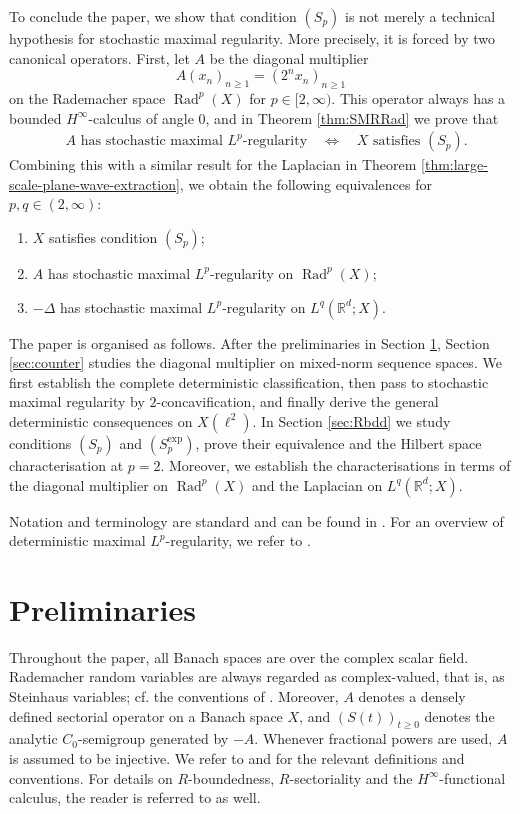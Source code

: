 \documentclass{amsart}
\let\geq\geqslant
\theoremstyle{plain}
\theoremstyle{remark}
\theoremstyle{plain}
\numberwithin{equation}{section}
\newcommand{\R}{\mathbb R}
\newcommand{\1}{\mathbf 1}
\newcommand{\Rad}{\operatorname{Rad}}
\begin{document}
To conclude the paper, we show that condition $(S_p)$ is not merely a technical hypothesis for stochastic maximal regularity. More precisely, it is forced by two canonical operators. First, let $A$ be the diagonal multiplier
\[
        A(x_n)_{n\geq1}=(2^nx_n)_{n\geq1}
\]
on the Rademacher space $\Rad^p(X)$ for $p \in [2,\infty)$. This operator always has a bounded $H^\infty$-calculus of angle $0$, and in Theorem \ref{thm:SMRRad} we prove that
\begin{equation*}
\begin{split}
&A\text{ has stochastic maximal $L^p$-regularity}\quad
\Longleftrightarrow\quad
X\text{ satisfies }(S_p).
\end{split}
\end{equation*}
Combining this with a similar result for the Laplacian in Theorem \ref{thm:large-scale-plane-wave-extraction}, we obtain the following equivalences for $p,q\in(2,\infty)$:
\begin{enumerate}[label={\rm(\roman*)}, leftmargin=*]
\item $X$ satisfies condition $(S_p)$;
\item $A$ has stochastic maximal $L^p$-regularity on $\Rad^p(X)$;
\item $-\Delta$ has stochastic maximal $L^p$-regularity on
$L^q(\R^d;X)$.
\end{enumerate}

\medskip

The paper is organised as follows. After the preliminaries in Section \ref{sec:prelim}, Section \ref{sec:counter} studies the diagonal multiplier on mixed-norm sequence spaces. We first establish the complete deterministic classification, then pass to stochastic maximal regularity by $2$-concavification, and finally derive the general deterministic consequences on $X(\ell^2)$. In Section \ref{sec:Rbdd} we study conditions $(S_p)$ and $(S_p^{\exp})$, prove their equivalence and the Hilbert space characterisation at $p=2$. Moreover, we establish the characterisations in terms of the diagonal multiplier on $\Rad^p(X)$ and the Laplacian on $L^q(\R^d;X)$.

Notation and terminology are standard and can be found in \cite{HNVW1,HNVW2}. For an  overview of deterministic maximal $L^p$-regularity, we refer to \cite[Chapter 17]{HNVW3}. 

\section{Preliminaries}\label{sec:prelim}
Throughout the paper, all Banach spaces are over the complex scalar field. Rademacher random variables are always regarded as complex-valued, that is, as Steinhaus variables; cf. the conventions of \cite{HNVW2}. Moreover, $A$ denotes a densely defined sectorial operator on a Banach space $X$, and $(S(t))_{t\geq0}$ denotes the analytic $C_0$-semigroup generated by $-A$. Whenever fractional powers are used, $A$ is assumed to be injective. We refer to \cite[Chapter 13]{Nee} and \cite[Chapter 10]{HNVW2} for the relevant definitions and conventions.
For details on $R$-boundedness, $R$-sectoriality and the $H^\infty$-functional calculus, the reader is referred to \cite{HNVW2} as well. 
\end{document}
